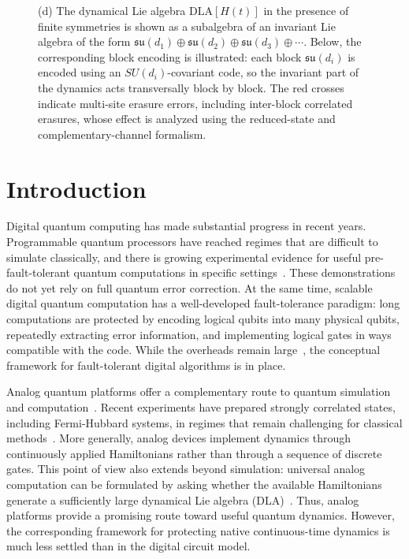 \documentclass[10pt,twocolumn,superscriptaddress,aps,amsmath,amssymb,citeautoscript,floatfix,prx]{revtex4-2}
\newcounter{alg}
\theoremstyle{plain}
\theoremstyle{plain}
\theoremstyle{plain}
\theoremstyle{plain}
\theoremstyle{plain}
\theoremstyle{plain}
\begin{document}
\begin{figure}[htbp]
{    (d) The dynamical Lie algebra $\text{DLA}[H(t)]$ in the presence of finite symmetries is shown as a subalgebra of an invariant Lie algebra of the form $\mathfrak{su}(d_1)\oplus\mathfrak{su}(d_2)\oplus\mathfrak{su}(d_3)\oplus\cdots$. Below, the corresponding block encoding is illustrated: each block $\mathfrak{su}(d_i)$ is encoded using an $SU(d_i)$-covariant code, so the invariant part of the dynamics acts transversally block by block. The red crosses indicate multi-site erasure errors, including inter-block correlated erasures, whose effect is analyzed using the reduced-state and complementary-channel formalism.
}
\label{fig:theme}

\end{figure}

\section{Introduction}\label{sec:main_intro}

Digital quantum computing has made substantial progress in recent years. Programmable quantum processors have reached regimes that are difficult to simulate classically, and there is growing experimental evidence for useful pre-fault-tolerant quantum computations in specific settings~\cite{Arute2019,Kim2023}. These demonstrations do not yet rely on full quantum error correction. At the same time, scalable digital quantum computation has a well-developed fault-tolerance paradigm: long computations are protected by encoding logical qubits into many physical qubits, repeatedly extracting error information, and implementing logical gates in ways compatible with the code. While the overheads remain large~\cite{Fowler2019, Gidney2021}, the conceptual framework for fault-tolerant digital algorithms is in place.

Analog quantum platforms offer a complementary route to quantum simulation and computation~\cite{Bloch2012,Browaeys2020,Daley2022,Schaefer2020}. Recent experiments have prepared strongly correlated states, including Fermi-Hubbard systems, in regimes that remain challenging for classical methods~\cite{Xu2025,Mazurenko2017,Shao2024,Chalopin2024}. More generally, analog devices implement dynamics through continuously applied Hamiltonians rather than through a sequence of discrete gates. This point of view also extends beyond simulation: universal analog computation can be formulated by asking whether the available Hamiltonians generate a sufficiently large dynamical Lie algebra (DLA)~\cite{Tavis1968,DAlessandro2021,Chen2020,Albertini2018,Albertini2020,Wang2016,Wang2012,Zanardi2004,AlbertiniDAlessandro2025,Hu2025}. Thus, analog platforms provide a promising route toward useful quantum dynamics. However, the corresponding framework for protecting native continuous-time dynamics is much less settled than in the digital circuit model.
\end{document}

